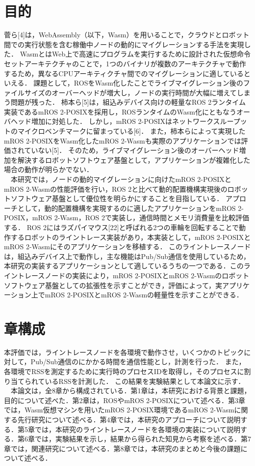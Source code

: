 \section{目的}
菅ら[4]は，WebAssembly（以下，Wasm）を用いることで，クラウドとロボット間での実行状態を含む稼働中ノードの動的にマイグレーションする手法を実現した．
WasmとはWeb上で高速にプログラムを実行するために設計された仮想命令セットアーキテクチャのことで，1つのバイナリが複数のアーキテクチャで動作するため，異なるCPUアーキティクチャ間でのマイグレーションに適しているといえる．
課題として，ROSをWasm化したことでライブマイグレーション後のファイルサイズのオーバーヘッドが増大し，ノードの実行時間が大幅に増えてしまう問題が残った．
柿本ら[5]は，組込みデバイス向けの軽量なROS 2ランタイム実装であるmROS 2-POSIXを採用し，ROSランタイムのWasm化にともなうオーバヘッド増加に対処した．
しかし，mROS 2-POSIXはネットワークスループットのマイクロベンチマークに留まっている[6]．
また，柿本らによって実現したmROS 2-POSIXをWasm化したmROS 2-Wasmも実際のアプリケーションでは評価されていない[5]．
そのため，ライブマイグレーション後のオーバーヘッド増加を解決するロボットソフトウェア基盤として，アプリケーションが複雑化した場合の動作が明らかでない．
\\　本研究では，ノードの動的マイグレーションに向けたmROS 2-POSIXとmROS 2-Wasmの性能評価を行い，ROS 2と比べて動的配置機構実現後のロボットソフトウェア基盤として優位性を明らかにすることを目指している．
アプローチとして，動的配置機構を実現するのに適したアプリケーションをmROS 2-POSIX，mROS 2-Wasm，ROS 2で実装し，通信時間とメモリ消費量を比較評価する．
ROS 2にはラズパイマウス[22]と呼ばれる2つの車輪を回転することで動作するロボットのライントレース実装があり，本実装として，mROS 2-POSIXとmROS 2-Wasmにそのアプリケーションを移植する．
このライントレースノードは，組込みデバイス上で動作し，主な機能はPub/Sub通信を使用しているため，本研究の実装するアプリケーションとして適しているうちの一つである．このライントレースノードの実装により，mROS 2-POSIXとmROS 2-Wasmのロボットソフトウェア基盤としての拡張性を示すことができ，評価によって，実アプリケーション上でmROS 2-POSIXとmROS 2-Wasmの軽量性を示すことができる．
\section{章構成}
本評価では，ライントレースノードを各環境で動作させ，いくつかのトピックに対して，Pub/Sub通信のにかかる時間を通信性能とし，計測を行った．
また，各環境でRSSを測定するために実行時のプロセスIDを取得し，そのプロセスに割り当てられているRSSを計測した．
この結果を実験結果として本論文に示す．
\\　本論文は，全8章から構成されている．第1章は，本研究における背景と課題，目的について述べた．第2章は，ROSやmROS 2-POSIXについて述べる．第3章では，Wasm仮想マシンを用いたmROS 2-POSIX環境であるmROS 2-Wasmに関する先行研究について述べる．第4章では，本研究のアプローチについて説明する．第5章では，本研究のライントレースノードを各環境の実装について説明する．第6章では，実験結果を示し，結果から得られた知見から考察を述べる．第7章では，関連研究について述べる．第8章では，本研究のまとめと今後の課題について述べる．
